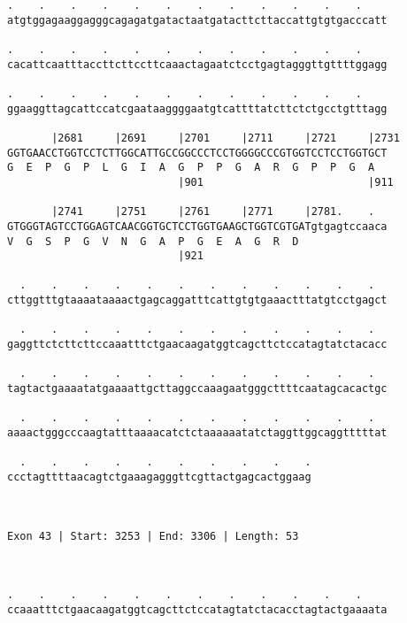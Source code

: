 \documentclass{article}
\begin{document}
\begin{Verbatim}
.    .    .    .    .    .    .    .    .    .    .    .    
atgtggagaaggagggcagagatgatactaatgatacttcttaccattgtgtgacccatt
                                                            
.    .    .    .    .    .    .    .    .    .    .    .    
cacattcaatttaccttcttccttcaaactagaatctcctgagtagggttgttttggagg
                                                            
.    .    .    .    .    .    .    .    .    .    .    .    
ggaaggttagcattccatcgaataaggggaatgtcattttatcttctctgcctgtttagg
                                                            
       |2681     |2691     |2701     |2711     |2721     |2731
GGTGAACCTGGTCCTCTTGGCATTGCCGGCCCTCCTGGGGCCCGTGGTCCTCCTGGTGCT
G  E  P  G  P  L  G  I  A  G  P  P  G  A  R  G  P  P  G  A  
                           |901                          |911
  
       |2741     |2751     |2761     |2771     |2781.    .  
GTGGGTAGTCCTGGAGTCAACGGTGCTCCTGGTGAAGCTGGTCGTGATgtgagtccaaca
V  G  S  P  G  V  N  G  A  P  G  E  A  G  R  D              
                           |921                             
  
  .    .    .    .    .    .    .    .    .    .    .    .  
cttggtttgtaaaataaaactgagcaggatttcattgtgtgaaactttatgtcctgagct
                                                            
  .    .    .    .    .    .    .    .    .    .    .    .  
gaggttctcttcttccaaatttctgaacaagatggtcagcttctccatagtatctacacc
                                                            
  .    .    .    .    .    .    .    .    .    .    .    .  
tagtactgaaaatatgaaaattgcttaggccaaagaatgggcttttcaatagcacactgc
                                                            
  .    .    .    .    .    .    .    .    .    .    .    .  
aaaactgggcccaagtatttaaaacatctctaaaaaatatctaggttggcaggtttttat
                                                            
  .    .    .    .    .    .    .    .    .    .
ccctagttttaacagtctgaaagagggttcgttactgagcactggaag
                                                
                                                
 
Exon 43 | Start: 3253 | End: 3306 | Length: 53



.    .    .    .    .    .    .    .    .    .    .    .    
ccaaatttctgaacaagatggtcagcttctccatagtatctacacctagtactgaaaata
                                                            

\end{Verbatim}
\end{document}
